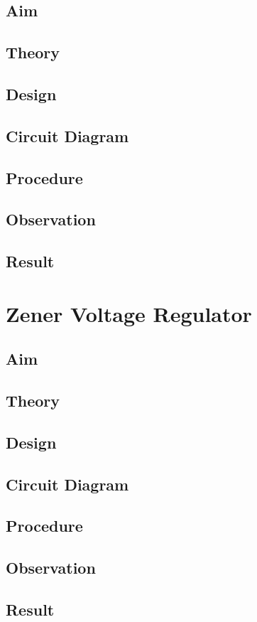 \documentclass{book}
\begin{document}
\section*{Aim}
\section*{Theory}
\section*{Design}
\section*{Circuit Diagram}
\section*{Procedure}
\section*{Observation}
\section*{Result}
\chapter[Zener Voltage Regulator]{Zener Voltage Regulator}
\section*{Aim}
\section*{Theory}
\section*{Design}
\section*{Circuit Diagram}
\section*{Procedure}
\section*{Observation}
\section*{Result}
\end{document}
